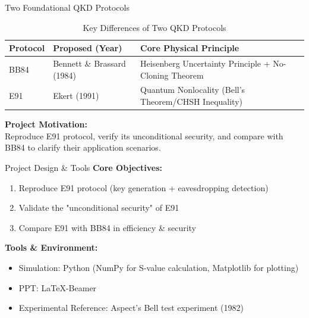 \documentclass{beamer} %
\begin{document}
\begin{frame}{Two Foundational QKD Protocols}
    \begin{table}[h]
        \centering
        \begin{tabular}{|l|l|l|}
            \hline
            \textbf{Protocol} & \textbf{Proposed (Year)} & \textbf{Core Physical Principle} \\
            \hline
            BB84 & Bennett \& Brassard (1984) & Heisenberg Uncertainty Principle + No-Cloning Theorem \\
            \hline
            E91 & Ekert (1991) & Quantum Nonlocality (Bell's Theorem/CHSH Inequality) \\
            \hline
        \end{tabular}
        \caption{Key Differences of Two QKD Protocols}
    \end{table}
    \vspace{1em}
    \textbf{Project Motivation:} \\
    Reproduce E91 protocol, verify its unconditional security, and compare with BB84 to clarify their application scenarios.
\end{frame}

\begin{frame}{Project Design \& Tools}
    \textbf{Core Objectives:}
    \begin{enumerate}[<+->]
        \item Reproduce E91 protocol (key generation + eavesdropping detection)
        \item Validate the "unconditional security" of E91
        \item Compare E91 with BB84 in efficiency \& security
    \end{enumerate}
    \vspace{1em}
    \textbf{Tools \& Environment:}
    \begin{itemize}[<+->]
        \item Simulation: Python (NumPy for S-value calculation, Matplotlib for plotting)
        \item PPT: LaTeX-Beamer
        \item Experimental Reference: Aspect's Bell test experiment (1982)
    \end{itemize}
\end{frame}
\end{document}
